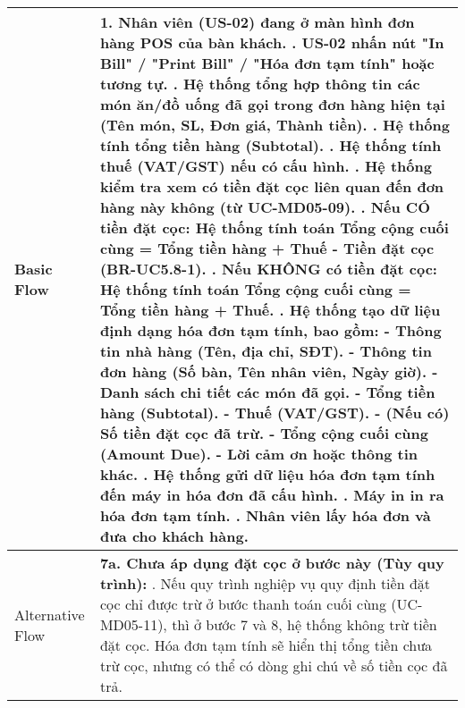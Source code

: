 \begin{longtable}{|m{4cm}|p{11cm}|}
\hline
Basic Flow & 1. Nhân viên (US-02) đang ở màn hình đơn hàng POS của bàn khách. \newline 2. US-02 nhấn nút "In Bill" / "Print Bill" / "Hóa đơn tạm tính" hoặc tương tự. \newline 3. Hệ thống tổng hợp thông tin các món ăn/đồ uống đã gọi trong đơn hàng hiện tại (Tên món, SL, Đơn giá, Thành tiền). \newline 4. Hệ thống tính tổng tiền hàng (Subtotal). \newline 5. Hệ thống tính thuế (VAT/GST) nếu có cấu hình. \newline 6. Hệ thống kiểm tra xem có tiền đặt cọc liên quan đến đơn hàng này không (từ UC-MD05-09). \newline 7. Nếu CÓ tiền đặt cọc: Hệ thống tính toán Tổng cộng cuối cùng = Tổng tiền hàng + Thuế - Tiền đặt cọc (BR-UC5.8-1). \newline 8. Nếu KHÔNG có tiền đặt cọc: Hệ thống tính toán Tổng cộng cuối cùng = Tổng tiền hàng + Thuế. \newline 9. Hệ thống tạo dữ liệu định dạng hóa đơn tạm tính, bao gồm: \newline    - Thông tin nhà hàng (Tên, địa chỉ, SĐT). \newline    - Thông tin đơn hàng (Số bàn, Tên nhân viên, Ngày giờ). \newline    - Danh sách chi tiết các món đã gọi. \newline    - Tổng tiền hàng (Subtotal). \newline    - Thuế (VAT/GST). \newline    - (Nếu có) Số tiền đặt cọc đã trừ. \newline    - Tổng cộng cuối cùng (Amount Due). \newline    - Lời cảm ơn hoặc thông tin khác. \newline 10. Hệ thống gửi dữ liệu hóa đơn tạm tính đến máy in hóa đơn đã cấu hình. \newline 11. Máy in in ra hóa đơn tạm tính. \newline 12. Nhân viên lấy hóa đơn và đưa cho khách hàng. \\
\hline
Alternative Flow & \textbf{7a. Chưa áp dụng đặt cọc ở bước này (Tùy quy trình):} \newline    1. Nếu quy trình nghiệp vụ quy định tiền đặt cọc chỉ được trừ ở bước thanh toán cuối cùng (UC-MD05-11), thì ở bước 7 và 8, hệ thống không trừ tiền đặt cọc. Hóa đơn tạm tính sẽ hiển thị tổng tiền chưa trừ cọc, nhưng có thể có dòng ghi chú về số tiền cọc đã trả. \\

\end{longtable}
